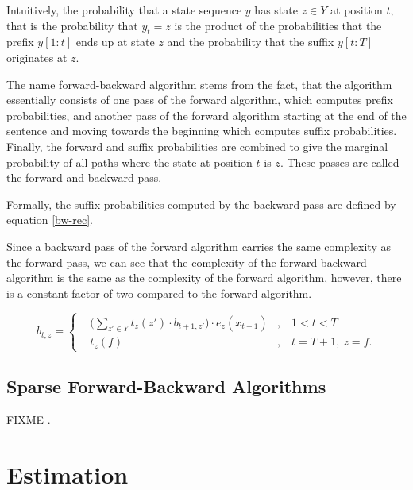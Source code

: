 Intuitively, the probability that a state sequence $y$ has state $z \in Y$
at position $t$, that is the probability that $y_t = z$ is the product
of the probabilities that the prefix $y[1:t]$ ends up at state $z$ and
the probability that the suffix $y[t:T]$ originates at $z$. 

The name forward-backward algorithm stems from the fact, that the
algorithm essentially consists of one pass of the forward algorithm,
which computes prefix probabilities, and another pass of the forward
algorithm starting at the end of the sentence and moving towards the
beginning which computes suffix probabilities. Finally, the forward
and suffix probabilities are combined to give the marginal probability
of all paths where the state at position $t$ is $z$. These passes are
called the forward and backward pass.

Formally, the suffix probabilities computed by the backward pass are
defined by equation \eqref{bw-rec}.

Since a backward pass of the forward algorithm carries the same
complexity as the forward pass, we can see that the complexity of the
forward-backward algorithm is the same as the complexity of the
forward algorithm, however, there is a constant factor of two compared
to the forward algorithm.

\begin{equation}
b_{t, z} = \left\{
\begin{aligned}
&\Bigg(\sum_{z'\in Y}t_{z}(z') \cdot  b_{t + 1, z'} \Bigg) \cdot e_{z}(x_{t+1}) & ,&\ 1 < t < T\\
&t_{z}(f) & ,&\  t = T + 1,\ z = f.
\end{aligned}
\right.
\label{bw-rec}
\end{equation}

\subsection{Sparse Forward-Backward Algorithms}

FIXME \citep{Pal2006}.

\section{Estimation}

